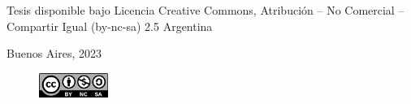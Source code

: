 \newpage
\pagestyle{empty}
Tesis disponible bajo Licencia Creative Commons, Atribución – No Comercial – Compartir Igual (by-nc-sa) 2.5 Argentina

Buenos Aires, 2023
\begin{figure}
    \centering
    \includegraphics[width=0.2\textwidth]{licencia.png}
\end{figure}